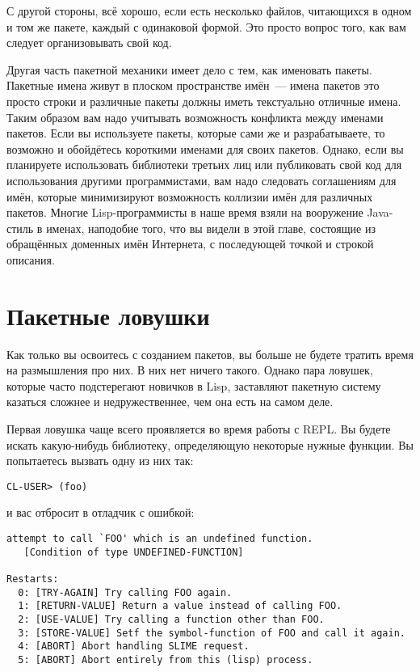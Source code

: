 С другой стороны, всё хорошо, если есть несколько файлов, читающихся в одном и том же
пакете, каждый с одинаковой формой. Это просто вопрос того, как вам
следует организовывать свой код.

Другая часть пакетной механики имеет дело с тем, как именовать пакеты. Пакетные имена
живут в плоском пространстве имён~--- имена пакетов это просто строки и различные пакеты
должны иметь текстуально отличные имена. Таким образом вам надо учитывать возможность
конфликта между именами пакетов. Если вы используете пакеты, которые сами же и
разрабатываете, то возможно и обойдётесь короткими именами для своих пакетов. Однако, если
вы планируете использовать библиотеки третьих лиц или публиковать свой код для
использования другими программистами, вам надо следовать соглашениям для имён, которые
минимизируют возможность коллизии имён для различных пакетов. Многие Lisp-программисты в
наше время взяли на вооружение Java-стиль в именах, наподобие того, что вы видели в этой
главе, состоящие из обращённых доменных имён Интернета, с последующей точкой и строкой
описания.

\section{Пакетные ловушки}
\label{sec:21-pitfalls}

Как только вы освоитесь с созданием пакетов, вы больше не будете тратить время на
размышления про них. В них нет ничего такого. Однако пара ловушек, которые часто
подстерегают новичков в Lisp, заставляют пакетную систему казаться сложнее и
недружественнее, чем она есть на самом деле.

Первая ловушка чаще всего проявляется во время работы с REPL. Вы будете искать
какую-нибудь библиотеку, определяющую некоторые нужные функции. Вы попытаетесь вызвать
одну из них так:

\begin{verbatim}
CL-USER> (foo)
\end{verbatim}

и вас отбросит в отладчик с ошибкой:

\begin{lstlisting}
attempt to call `FOO' which is an undefined function.
   [Condition of type UNDEFINED-FUNCTION]

Restarts:
  0: [TRY-AGAIN] Try calling FOO again.
  1: [RETURN-VALUE] Return a value instead of calling FOO.
  2: [USE-VALUE] Try calling a function other than FOO.
  3: [STORE-VALUE] Setf the symbol-function of FOO and call it again.
  4: [ABORT] Abort handling SLIME request.
  5: [ABORT] Abort entirely from this (lisp) process.
\end{lstlisting}

